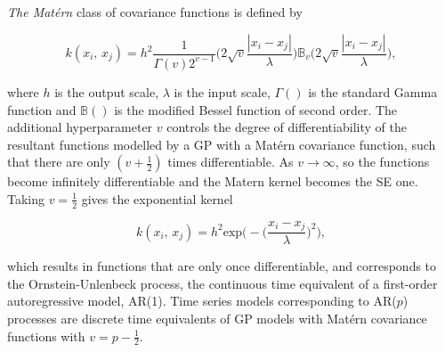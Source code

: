         \vspace{1em}

         \textit{The Mat\'ern} class of covariance functions is defined by

         \[k(x_{i}, \, x_{j}) = h^{2} \frac{1}{\Gamma(v)2^{v-1}} \bigg(2\sqrt{v}\frac{|x_{i} - x_{j}|}{\lambda} \bigg) \mathbb{B}_{v} \bigg(2\sqrt{v}\frac{|x_{i} - x_{j}|}{\lambda} \bigg),\]

         where \(h\) is the output scale, \(\lambda\) is the input scale, \(\Gamma()\) is the standard Gamma function and \(\mathbb{B}()\) is the modified Bessel function of second order. The additional hyperparameter \(v\) controls the degree of differentiability of the resultant functions modelled by a GP with a Mat\'ern covariance function, such that there are only \((v + \frac{1}{2})\) times differentiable. As \(v \to \infty\), so the functions become infinitely differentiable and the Matern kernel becomes the SE one. Taking \(v = \frac{1}{2}\) gives the exponential kernel

         \[k(x_{i}, \, x_{j}) = h^{2} \text{exp} \bigg(- \Big(\frac{x_i - x_j}{\lambda} \Big)^2 \bigg),\]

         which results in functions that are only once differentiable, and corresponds to the Ornstein-Unlenbeck process, the continuous time equivalent of a first-order autoregressive model, AR(1). Time series models corresponding to AR(\(p\)) processes are discrete time equivalents of GP models with Mat\'ern covariance functions with \(v = p - \frac{1}{2}\).

         \vspace{1em}

